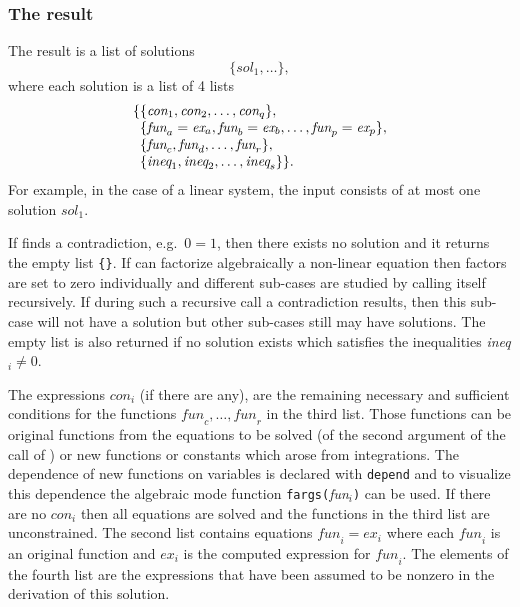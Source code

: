 \subsubsection{The result}
The result is a list of solutions
\[ \{\textit{sol}_1, \ldots \}, \]
where each solution is a list of 4 lists
\[ \begin{array}{r@{}l}
  \{ & \{\textit{con}_1, \textit{con}_2, \ldots , \textit{con}_q\}, \\
  &\{\textit{fun}_a=\textit{ex}_a, \textit{fun}_b=\textit{ex}_b,
  \ldots , \textit{fun}_p=\textit{ex}_p\}, \\
  &\{\textit{fun}_c, \textit{fun}_d, \ldots , \textit{fun}_r\}, \\
  &\{\textit{ineq}_1, \textit{ineq}_2, \ldots , \textit{ineq}_s\} \}.
\end{array} \]
For example, in the case of a linear system, the input consists of at
most one solution $\textit{sol}_1$.

If  finds a contradiction, e.g.\ $0=1$, then there
exists no solution and it returns the empty list \texttt{\{\}}.  If
 can factorize algebraically a non-linear equation then
factors are set to zero individually and different sub-cases are
studied by  calling itself recursively.  If during such
a recursive call a contradiction results, then this sub-case will not
have a solution but other sub-cases still may have solutions.  The
empty list is also returned if no solution exists which satisfies the
inequalities \textit{ineq}$_i \neq 0$.

The expressions $\textit{con}_i$ (if there are any), are the remaining
necessary and sufficient conditions for the functions
$\textit{fun}_c,\ldots,\textit{fun}_r$ in the third list.  Those
functions can be original functions from the equations to be solved
(of the second argument of the call of ) or new
functions or constants which arose from integrations.  The dependence
of new functions on variables is declared with \texttt{depend} and to
visualize this dependence the algebraic mode function
\texttt{fargs(}\textit{fun}$_i$\texttt{)} can be used.  If there are
no $\textit{con}_i$ then all equations are solved and the functions in
the third list are unconstrained.  The second list contains equations
$\textit{fun}_i=\textit{ex}_i$ where each $\textit{fun}_i$ is an
original function and $\textit{ex}_i$ is the computed expression for
$\textit{fun}_i$.  The elements of the fourth list are the expressions
that have been assumed to be nonzero in the derivation of this
solution.

